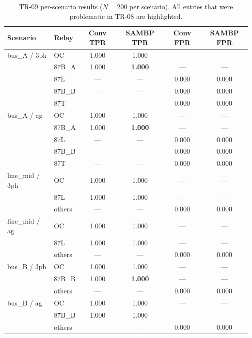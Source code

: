 \documentclass[12pt,a4paper]{article}
\begin{document}
\begin{table}[ht]
\centering
\caption{TR-09 per-scenario results ($N=200$ per scenario).
  All entries that were problematic in TR-08 are highlighted.}
\label{tab:perscenario}
\small
\setlength\tabcolsep{4pt}
\begin{tabular}{llcccc}
\toprule
Scenario & Relay & Conv TPR & SAMBP TPR & Conv FPR & SAMBP FPR \\
\midrule
bus\_A / 3ph   & OC     & 1.000 & 1.000 & --- & --- \\
               & 87B\_A & 1.000 & \textcolor{okgreen}{\textbf{1.000}} & --- & --- \\
               & 87L    & ---   & ---   & 0.000 & 0.000 \\
               & 87B\_B & ---   & ---   & 0.000 & 0.000 \\
               & 87T    & ---   & ---   & 0.000 & 0.000 \\[2pt]
bus\_A / ag    & OC     & 1.000 & 1.000 & --- & --- \\
               & 87B\_A & 1.000 & \textcolor{okgreen}{\textbf{1.000}} & --- & --- \\
               & 87L    & ---   & ---   & 0.000 & 0.000 \\
               & 87B\_B & ---   & ---   & 0.000 & 0.000 \\
               & 87T    & ---   & ---   & 0.000 & 0.000 \\[2pt]
line\_mid / 3ph & OC    & 1.000 & 1.000 & --- & --- \\
                & 87L   & 1.000 & 1.000 & --- & --- \\
                & others & ---  & ---   & 0.000 & 0.000 \\[2pt]
line\_mid / ag  & OC    & 1.000 & 1.000 & --- & --- \\
                & 87L   & 1.000 & 1.000 & --- & --- \\
                & others & ---  & ---   & 0.000 & 0.000 \\[2pt]
bus\_B / 3ph   & OC     & 1.000 & 1.000 & --- & --- \\
               & 87B\_B & 1.000 & \textcolor{okgreen}{\textbf{1.000}} & --- & --- \\
               & others & ---   & ---   & 0.000 & 0.000 \\[2pt]
bus\_B / ag    & OC     & 1.000 & 1.000 & --- & --- \\
               & 87B\_B & 1.000 & 1.000 & --- & --- \\
               & others & ---   & ---   & 0.000 & 0.000 \\[2pt]

\end{tabular}
\end{table}
\end{document}
